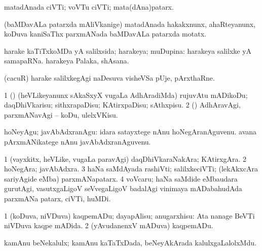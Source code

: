 \bentry
{} 
\gl{\nA}
\expl{}
\bmng
 matadAnada ciVTi; voVTu ciVTi; mata(dAna)patarx. 
\emng
\eentry

\bentry 
{}
\gl{\nA}
\expl{}
\bmng
 (baMDavALa patarxda mAliVkanige) matadAnada hakakxnunx, ahaRteyanunx, koDuva kaniSaThx parxmANada baMDavALa patarxda motatx. 
\emng
\eentry

\bentry 
{} 
\gl{\gu}
\bmng
 harake kaTiTxkoMDa yA salilxsida; harakeya; muDupina:  harakeya salilxke yA samapaRNa.  harakeya Palaka, shAsana. 
\emng
\eentry

\bentry
{}
\gl{\nA}
\expl{}
\bmng
 (cacuR) harake salilxkegAgi naDesuva visheVSa pUje, pArxthaRne. 
\emng
\eentry

\bentry 
{} 
\gl{\akirx}
\expl{}
\bmng
\bnum
\num{1} (\pArxparx) (heVLikeyanunx sAkaSxyX \mo vugaLa AdhAradiMda) rujuvAtu mADikoDu; daqDhiVkarisu; sithxrapaDisu; KAtirxpaDisu; sAthxpisu. 
\num{2} (\pArxparx) AdhAravAgi, parxmANavAgi -- koDu, ulelxVKisu. 
\enum
\emng

\noindent 
\gl{\akirx}
\expl{}
\bmng
 hoNeyAgu; javAbAdxranAgu:  idara satayxtege nAnu hoNegAranAguvenu.  avana pArxmANikatege nAnu javAbAdxranAguvenu. 
\emng
\eentry

\bentry 
{} 
\gl{\nA}
\expl{}
\bmng
\bnum
\num{1} (vayxkitx, heVLike, \mo vugaLa paravAgi) daqDhiVkaraNakAra; KAtirxgAra. 
\num{2} hoNegAra; javAbAdxra. 
\num{3} haNa saMdAyada rashiVti; salilxkeciVTi; (lekAkxcAra sariyAgide eMba) parxmANapatarx. 
\num{4} voVcaru; haNa saMdide eMbaudara gurutAgi, vasutxgaLigoV seVvegaLigoV badalAgi vinimaya mADabahudAda parxmANa patarx, ciVTi, huMDi. 
\enum
\emng
\eentry

\bentry 
{} 
\gl{\sakirx}
\expl{}
\bmng
\bnum
\num{1} (koDuva, niVDuva) kaqpemADu; dayapAlisu; anugarxhisu:  Ata nanage BeVTi niVDuva kaqpe mADida. 
\num{2} (yAvudanenxV mADuva) kaqpemADu. 
\enum
\emng
\eentry

\bentry 
{} 
\gl{\nA}
\expl{}
\bmng
 kamAnu beNekalulx; kamAnu kaTaTxDada, beNeyAkArada kalulxgaLalolxMdu. 
\emng
\eentry

